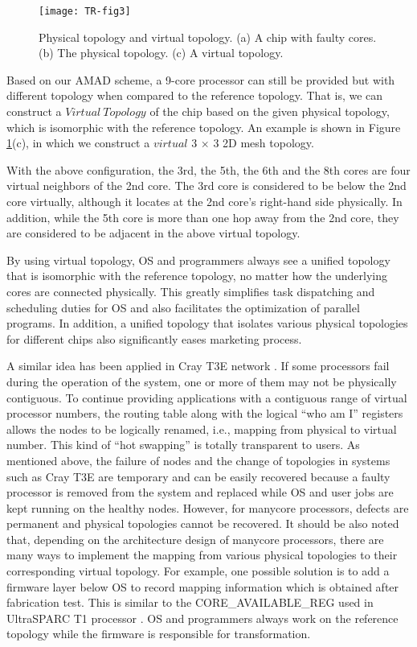 \begin{figure}[t]
    \centering
        \texttt{[image: TR-fig3]}
          \caption{ Physical topology and virtual topology. (a) A chip with faulty cores.
          (b) The physical topology. (c) A virtual topology.}
             \label{fig3}
\end{figure}

Based on our AMAD scheme, a 9-core processor can still be provided but with different topology when compared to the reference topology. That is, we can construct a $Virtual\ Topology$ of the chip based on the given physical topology, which is isomorphic with the reference topology. An example is shown in Figure \ref{fig3}(c), in which we construct a $virtual$ 3 $\times$ 3 2D mesh topology.

With the above configuration, the 3rd, the 5th, the 6th and the 8th cores are four virtual neighbors of the 2nd core. The 3rd core is considered to be below the 2nd core virtually, although it locates at the 2nd core’s right-hand side physically. In addition, while the 5th core is more than one hop away from the 2nd core, they are considered to be adjacent in the above virtual topology.

By using virtual topology, OS and programmers always see a unified topology that is isomorphic with the reference topology, no matter how the underlying cores are connected physically. This greatly simplifies task dispatching and scheduling duties for OS and also facilitates the optimization of parallel programs. In addition, a unified topology that isolates various physical topologies for different chips also significantly eases marketing
process.

A similar idea has been applied in Cray T3E network \cite{scott1996cray}. If some processors fail during the operation of the system, one or more of them may not be physically contiguous. To continue providing applications with a contiguous range of virtual processor numbers, the routing table along with the logical “who am I” registers allows the nodes to be logically renamed, i.e., mapping from physical to virtual number. This kind of “hot swapping” is totally transparent to users. As mentioned above, the failure of nodes and the change of topologies in systems such as Cray T3E are temporary and can be easily recovered because a faulty processor is removed from the system and replaced while OS and user jobs are kept running on the healthy nodes. However, for manycore processors, defects are permanent and physical topologies cannot be recovered. It should be also noted that, depending on the architecture design of manycore processors, there are many ways to implement the mapping from various physical topologies to their corresponding virtual topology. For example, one possible solution is to add a firmware layer below OS to record mapping information which is obtained after fabrication test. This is similar to the CORE\_AVAILABLE\_REG used in UltraSPARC T1 processor \cite{parulkar2002scalable,tan2006testing}. OS and programmers always work on the reference topology while the firmware is responsible for transformation.

